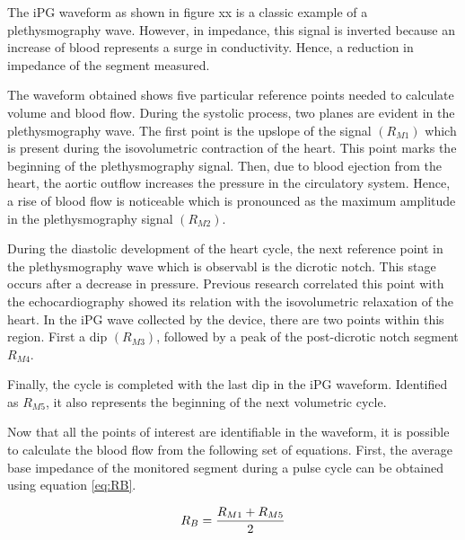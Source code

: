 
The iPG waveform as shown in figure xx is a classic example of a plethysmography wave. However, in impedance, this signal is inverted because an increase of blood represents a surge in conductivity. Hence, a reduction in impedance of the segment measured.  


The waveform obtained shows five particular reference points needed to calculate volume and blood flow. During the systolic process, two planes are evident in the plethysmography wave. The first point is the upslope of the signal $(R_{M1})$ which is present during the isovolumetric contraction of the heart.  This point marks the beginning of the plethysmography signal. Then, due to blood ejection from the heart, the aortic outflow increases the pressure in the circulatory system. Hence, a rise of blood flow is noticeable which is pronounced as the maximum amplitude in the plethysmography signal $(R_{M2})$. 

During the diastolic development of the heart cycle, the next reference point in the plethysmography wave which is observabl is the dicrotic notch. This stage occurs after a decrease in pressure. Previous research correlated this point with the echocardiography showed its relation with the isovolumetric relaxation of the heart. In the iPG wave collected by the device, there are two points within this region. First a dip $(R_{M3})$, followed by a peak of the post-dicrotic notch segment $R_{M4}$. 


Finally, the cycle is completed with the last dip in the iPG waveform. Identified as $R_{M5}$, it also represents the beginning of the next volumetric cycle. 

Now that all the points of interest are identifiable in the waveform, it is possible to calculate the blood flow from the following set of equations. First, the average base impedance of the monitored segment during a pulse cycle can be obtained using equation \ref{eq:RB}.

\begin{align}
	\label{eq:RB}
	R_B = \frac{R_{M1}+R_{M5}}{2} \tagaddtext{[\si{\Omega}]}
\end{align}

